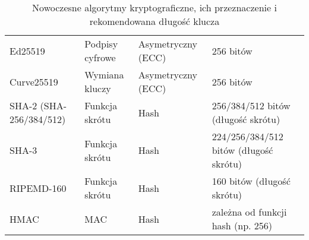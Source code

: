 \documentclass{article}
\theoremstyle{definition}
\theoremstyle{remark}
\begin{document}
\begin{table}[ht]
\begin{tabular}{|l|l|l|l|}
        Ed25519                 & Podpisy cyfrowe          & Asymetryczny (ECC)       & 256 bitów                              \\
        Curve25519              & Wymiana kluczy           & Asymetryczny (ECC)       & 256 bitów                              \\
        \hline
        SHA-2 (SHA-256/384/512) & Funkcja skrótu           & Hash                     & 256/384/512 bitów (długość skrótu)     \\
        SHA-3                   & Funkcja skrótu           & Hash                     & 224/256/384/512 bitów (długość skrótu) \\
        RIPEMD-160              & Funkcja skrótu           & Hash                     & 160 bitów (długość skrótu)             \\
        HMAC                    & MAC                      & Hash                     & zależna od funkcji hash (np. 256)      \\
        \hline
    \end{tabular}
    \caption{Nowoczesne algorytmy kryptograficzne, ich przeznaczenie i rekomendowana długość klucza}
\end{table}
\end{document}
